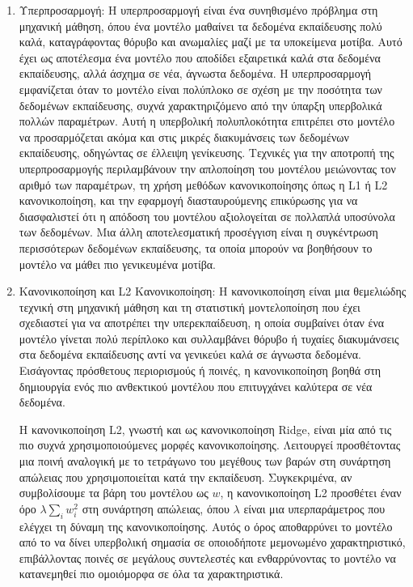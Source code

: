 \begin{enumerate}
    \item Υπερπροσαρμογή: Η υπερπροσαρμογή είναι ένα συνηθισμένο πρόβλημα στη μηχανική μάθηση, όπου ένα μοντέλο μαθαίνει τα δεδομένα εκπαίδευσης πολύ καλά, καταγράφοντας θόρυβο και ανωμαλίες μαζί με τα υποκείμενα μοτίβα. Αυτό έχει ως αποτέλεσμα ένα μοντέλο που αποδίδει εξαιρετικά καλά στα δεδομένα εκπαίδευσης, αλλά άσχημα σε νέα, άγνωστα δεδομένα. Η υπερπροσαρμογή εμφανίζεται όταν το μοντέλο είναι πολύπλοκο σε σχέση με την ποσότητα των δεδομένων εκπαίδευσης, συχνά χαρακτηριζόμενο από την ύπαρξη υπερβολικά πολλών παραμέτρων. Αυτή η υπερβολική πολυπλοκότητα επιτρέπει στο μοντέλο να προσαρμόζεται ακόμα και στις μικρές διακυμάνσεις των δεδομένων εκπαίδευσης, οδηγώντας σε έλλειψη γενίκευσης. Τεχνικές για την αποτροπή της υπερπροσαρμογής περιλαμβάνουν την απλοποίηση του μοντέλου μειώνοντας τον αριθμό των παραμέτρων, τη χρήση μεθόδων κανονικοποίησης όπως η L1 ή L2 κανονικοποίηση, και την εφαρμογή διασταυρούμενης επικύρωσης για να διασφαλιστεί ότι η απόδοση του μοντέλου αξιολογείται σε πολλαπλά υποσύνολα των δεδομένων. Μια άλλη αποτελεσματική προσέγγιση είναι η συγκέντρωση περισσότερων δεδομένων εκπαίδευσης, τα οποία μπορούν να βοηθήσουν το μοντέλο να μάθει πιο γενικευμένα μοτίβα.

    \item Κανονικοποίηση και L2 Κανονικοποίηση: Η κανονικοποίηση είναι μια θεμελιώδης τεχνική στη μηχανική μάθηση και τη στατιστική μοντελοποίηση που έχει σχεδιαστεί για να αποτρέπει την υπερεκπαίδευση, η οποία συμβαίνει όταν ένα μοντέλο γίνεται πολύ περίπλοκο και συλλαμβάνει θόρυβο ή τυχαίες διακυμάνσεις στα δεδομένα εκπαίδευσης αντί να γενικεύει καλά σε άγνωστα δεδομένα. Εισάγοντας πρόσθετους περιορισμούς ή ποινές, η κανονικοποίηση βοηθά στη δημιουργία ενός πιο ανθεκτικού μοντέλου που επιτυγχάνει καλύτερα σε νέα δεδομένα.

    Η κανονικοποίηση L2, γνωστή και ως κανονικοποίηση Ridge, είναι μία από τις πιο συχνά χρησιμοποιούμενες μορφές κανονικοποίησης. Λειτουργεί προσθέτοντας μια ποινή αναλογική με το τετράγωνο του μεγέθους των βαρών στη συνάρτηση απώλειας που χρησιμοποιείται κατά την εκπαίδευση. Συγκεκριμένα, αν συμβολίσουμε τα βάρη του μοντέλου ως \( w \), η κανονικοποίηση L2 προσθέτει έναν όρο \(\lambda \sum_{i} w_i^2\) στη συνάρτηση απώλειας, όπου \(\lambda\) είναι μια υπερπαράμετρος που ελέγχει τη δύναμη της κανονικοποίησης. Αυτός ο όρος αποθαρρύνει το μοντέλο από το να δίνει υπερβολική σημασία σε οποιοδήποτε μεμονωμένο χαρακτηριστικό, επιβάλλοντας ποινές σε μεγάλους συντελεστές και ενθαρρύνοντας το μοντέλο να κατανεμηθεί πιο ομοιόμορφα σε όλα τα χαρακτηριστικά.
    

\end{enumerate}
